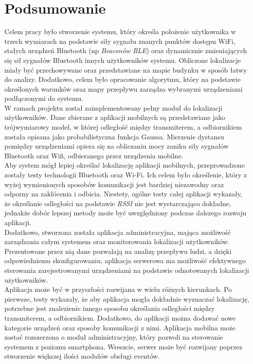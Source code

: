 \chapter{Podsumowanie}
Celem pracy było stworzenie systemu, który określa położenie użytkownika w trzech wymiarach na podstawie siły sygnału znanych punktów dostępu WiFi, stałych urządzeń Bluetooth (np \textit{Beaconów BLE}) oraz dynamicznie zmieniających się sił sygnałów Bluetooth innych użytkowników systemu. Obliczone lokalizacje miały być przechowywane oraz przedstawiane na mapie budynku w sposób łatwy do analizy. Dodatkowo, celem było opracowanie algorytmu, który na podstawie określonych warunków oraz mapy przepływu zarządza wybranymi urządzeniami podłączonymi do systemu.\\
W ramach projektu został zaimplementowany pełny moduł do lokalizacji użytkowników. Dane zbierane z aplikacji mobilnych są przedstawiane jako trójwymiarowy model, w której odległość między transmiterem, a odbiornikiem została opisana jako probabilistyczna funkcja Gaussa. Mierzenie dystansu pomiędzy urządzeniami opiera się na obliczaniu mocy zaniku siły sygnałów Bluetooth oraz Wifi, odbieranego przez urządzenia mobilne.\\
Aby system mógł lepiej określać lokalizację aplikacji mobilnych, przeprowadzone zostały testy technologii Bluetooth oraz Wi-Fi. Ich celem było określenie, który z wyżej wymienionych sposobów komunikacji jest bardziej niezawodny oraz odporny na zakłócenia i odbicia. Niestety, ogólne testy całej aplikacji wykazały, że określanie odległości na podstawie \textit{RSSI} nie jest wystarczająco dokładne, jednakże dobór lepszej metody może być uwzględniony podczas dalszego rozwoju aplikacji.\\
Dodatkowo, stworzona została aplikacja administracyjna, mająca możliwość zarządzania całym systemem oraz monitorowania lokalizacji użytkowników. Prezentowane przez nią dane pozwalają na analizę przepływu ludzi, a dzięki odpowiedniemu skonfigurowaniu, aplikacja serwerowa ma możliwość efektywnego sterowania zarejestrowanymi urządzeniami na podstawie odnotowanych lokalizacji użytkowników.\\
Aplikacja może być w przyszłości rozwijana w wielu różnych kierunkach. Po pierwsze, testy wykazały, że aby aplikacja mogła dokładnie wyznaczać lokalizację, potrzebne jest znalezienie innego sposobu określania odległości między transmiterem, a odbiornikiem. Dodatkowo, do aplikacji można dodawać nowe kategorie urządzeń oraz sposoby komunikacji z nimi. Aplikacja mobilna może zostać rozszerzona o moduł administracyjny, który pozwoli na sterowanie systemem z poziomu smartphona. Wreszcie, serwer może być rozwijany poprzez  stworzenie większej ilości modułów obsługi eventów.\\



